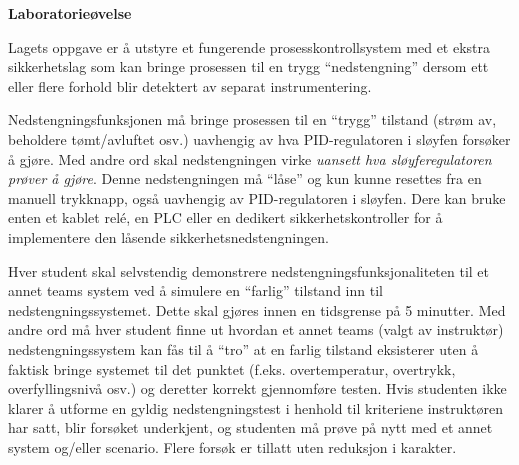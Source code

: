 

\noindent
{\bf Laboratorieøvelse}

\vskip 5pt

Lagets oppgave er å utstyre et fungerende prosesskontrollsystem med et ekstra sikkerhetslag som kan bringe prosessen til en trygg ``nedstengning'' dersom ett eller flere forhold blir detektert av separat instrumentering.

Nedstengningsfunksjonen må bringe prosessen til en ``trygg'' tilstand (strøm av, beholdere tømt/avluftet osv.) uavhengig av hva PID-regulatoren i sløyfen forsøker å gjøre.  Med andre ord skal nedstengningen virke {\it uansett hva sløyferegulatoren prøver å gjøre}.  Denne nedstengningen må ``låse'' og kun kunne resettes fra en manuell trykknapp, også uavhengig av PID-regulatoren i sløyfen.  Dere kan bruke enten et kablet relé, en PLC eller en dedikert sikkerhetskontroller for å implementere den låsende sikkerhetsnedstengningen.

Hver student skal selvstendig demonstrere nedstengningsfunksjonaliteten til et annet teams system ved å simulere en ``farlig'' tilstand inn til nedstengningssystemet.  Dette skal gjøres innen en tidsgrense på 5 minutter.  Med andre ord må hver student finne ut hvordan et annet teams (valgt av instruktør) nedstengningssystem kan fås til å ``tro'' at en farlig tilstand eksisterer uten å faktisk bringe systemet til det punktet (f.eks. overtemperatur, overtrykk, overfyllingsnivå osv.) og deretter korrekt gjennomføre testen.  Hvis studenten ikke klarer å utforme en gyldig nedstengningstest i henhold til kriteriene instruktøren har satt, blir forsøket underkjent, og studenten må prøve på nytt med et annet system og/eller scenario.  Flere forsøk er tillatt uten reduksjon i karakter.

\vskip 10pt



